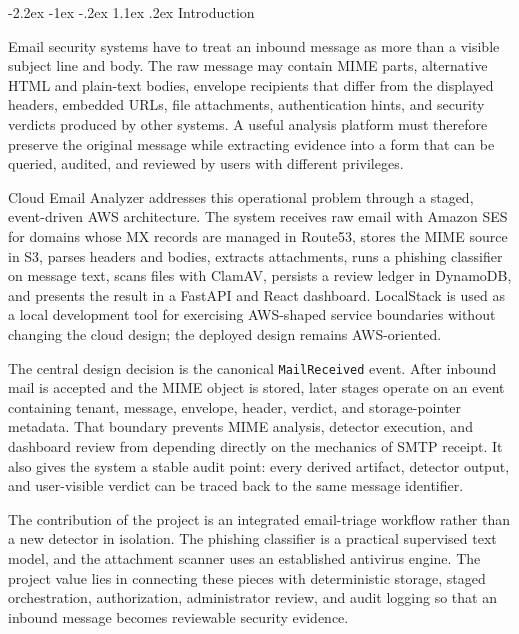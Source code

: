 \documentclass[12pt,a4paper]{article}
\makeatletter
\renewcommand\section{\@startsection {section}{1}{\z@}%
  {-2.2ex \@plus -1ex \@minus -.2ex}%
  {1.1ex \@plus .2ex}%
  {\centering\normalfont\normalsize\bfseries}}
\makeatother
\begin{document}
\vfill
{}
\vspace{1.0em}
\newpage

\section{Introduction}

Email security systems have to treat an inbound message as more than a visible subject line and body. The raw message may contain MIME parts, alternative HTML and plain-text bodies, envelope recipients that differ from the displayed headers, embedded URLs, file attachments, authentication hints, and security verdicts produced by other systems. A useful analysis platform must therefore preserve the original message while extracting evidence into a form that can be queried, audited, and reviewed by users with different privileges.

Cloud Email Analyzer addresses this operational problem through a staged, event-driven AWS architecture. The system receives raw email with Amazon SES for domains whose MX records are managed in Route53, stores the MIME source in S3, parses headers and bodies, extracts attachments, runs a phishing classifier on message text, scans files with ClamAV, persists a review ledger in DynamoDB, and presents the result in a FastAPI and React dashboard. LocalStack is used as a local development tool for exercising AWS-shaped service boundaries without changing the cloud design; the deployed design remains AWS-oriented.

The central design decision is the canonical \texttt{MailReceived} event. After inbound mail is accepted and the MIME object is stored, later stages operate on an event containing tenant, message, envelope, header, verdict, and storage-pointer metadata. That boundary prevents MIME analysis, detector execution, and dashboard review from depending directly on the mechanics of SMTP receipt. It also gives the system a stable audit point: every derived artifact, detector output, and user-visible verdict can be traced back to the same message identifier.

The contribution of the project is an integrated email-triage workflow rather than a new detector in isolation. The phishing classifier is a practical supervised text model, and the attachment scanner uses an established antivirus engine. The project value lies in connecting these pieces with deterministic storage, staged orchestration, authorization, administrator review, and audit logging so that an inbound message becomes reviewable security evidence.
\end{document}
